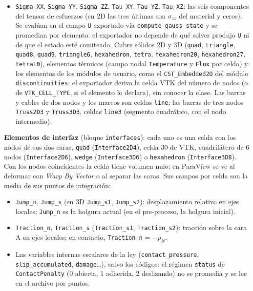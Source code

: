\documentclass[11pt,oneside]{report}
\begin{document}
\begin{itemize}
  \item \texttt{Sigma\_XX}, \texttt{Sigma\_YY}, \texttt{Sigma\_ZZ}, \texttt{Tau\_XY}, \texttt{Tau\_YZ}, \texttt{Tau\_XZ}: las seis componentes del tensor de esfuerzos (en 2D las tres últimas son $\sigma_{zz}$ del material y ceros). Se evalúan en el campo \texttt{U} exportado vía \texttt{compute\_\allowbreak{}gauss\_\allowbreak{}state} y se promedian por elemento: el exportador no depende de qué solver produjo \texttt{U} ni de que el estado esté comiteado. Cubre sólidos 2D y 3D (\texttt{quad}, \texttt{triangle}, \texttt{quad8}, \texttt{quad9}, \texttt{triangle6}, \texttt{hexahedron}, \texttt{tetra}, \texttt{hexahedron20}, \texttt{hexahedron27}, \texttt{tetra10}), elementos térmicos (campo nodal \texttt{Temperature} y \texttt{Flux} por celda) y los elementos de los módulos de usuario, como el \texttt{CST\_Embedded2D} del módulo \texttt{discontinuities}: el exportador deriva la celda VTK del número de nodos (o de \texttt{VTK\_CELL\_TYPE}, si el elemento lo declara), sin conocer la clase. Las barras y cables de dos nodos y los marcos son celdas \texttt{line}; las barras de tres nodos \texttt{Truss2D3} y \texttt{Truss3D3}, celdas \texttt{line3} (segmento cuadrático, con el nodo intermedio).
\end{itemize}

\textbf{Elementos de interfaz} (bloque \texttt{interfaces}): cada uno es una celda con los nodos de sus dos caras, \texttt{quad} (\texttt{Interface2D4}), celda 30 de VTK, cuadrilátero de 6 nodos (\texttt{Interface2D6}), \texttt{wedge} (\texttt{Interface3D6}) o \texttt{hexahedron} (\texttt{Interface3D8}). Con los nodos coincidentes la celda tiene volumen nulo; en ParaView se ve al deformar con \textit{Warp By Vector} o al separar las caras. Sus campos por celda son la media de sus puntos de integración:

\begin{itemize}
  \item \texttt{Jump\_n}, \texttt{Jump\_s} (en 3D \texttt{Jump\_s1}, \texttt{Jump\_s2}): desplazamiento relativo en ejes locales; \texttt{Jump\_n} es la holgura actual (en el pre-proceso, la holgura inicial).
  \item \texttt{Traction\_n}, \texttt{Traction\_s} (\texttt{Traction\_s1}, \texttt{Traction\_s2}): tracción sobre la cara A en ejes locales; en contacto, \texttt{Traction\_n} = $-p_N$.
  \item Las variables internas escalares de la ley (\texttt{contact\_pressure}, \texttt{slip\_accumulated}, \texttt{damage}\ldots{}), salvo los códigos: el régimen \texttt{status} de \texttt{ContactPenalty} (0 abierta, 1 adherida, 2 deslizando) no se promedia y se lee en el archivo por puntos.
\end{itemize}
\end{document}
